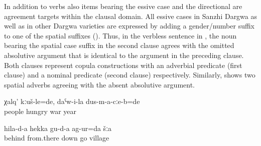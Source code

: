 In addition to verbs also items bearing the essive case and the directional are agreement targets within the clausal domain. All essive cases in Sanzhi Dargwa as well as in other Dargwa varieties are expressed by adding a gender/number suffix to one of the spatial suffixes (). Thus, in the verbless sentence in , the noun bearing the spatial case suffix  in the second clause agrees with the omitted absolutive argument that is identical to the argument in the preceding clause. Both clauses represent copula constructions with an adverbial predicate (first clause) and a nominal predicate (second clause) respectively. Similarly,  shows two spatial adverbs agreeing with the absent absolutive argument.
%
\begin{exe}
	\ex	\label{ex:The people were hungry, it was during the years of war@12}
	\gll	χalq'	kːuš-le=de,	daˁw-i-la	dus-m-a-cːe-b=de\\
		people	hungry	war	year\\
	\glt	{}

	\ex	\label{ex:‎Back (reversing) from there we went down to the village}
	\gll	hila-d-a	hekka	gu-d-a	ag-ur=da	šːa\\
		behind	from.there	down	go	village\\
	\glt	{}
\end{exe}

